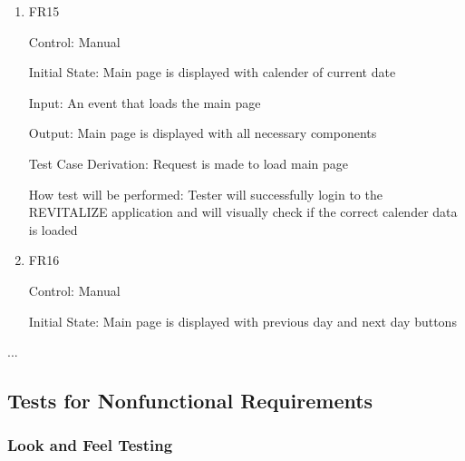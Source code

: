 \documentclass[12pt, titlepage]{article}
\begin{document}
\begin{enumerate}

\item{FR15\\}

Control: Manual
					
Initial State: Main page is displayed with calender of current date
					
Input: An event that loads the main page
					
Output: Main page is displayed with all necessary components

Test Case Derivation: Request is made to load main page

How test will be performed: Tester will successfully login to the REVITALIZE application and will visually check if the correct calender data is loaded
					
\item{FR16\\}

Control: Manual
					
Initial State: Main page is displayed with previous day and next day buttons
					

\end{enumerate}
...

\subsection{Tests for Nonfunctional Requirements}



\subsubsection{Look and Feel Testing}
\end{document}
